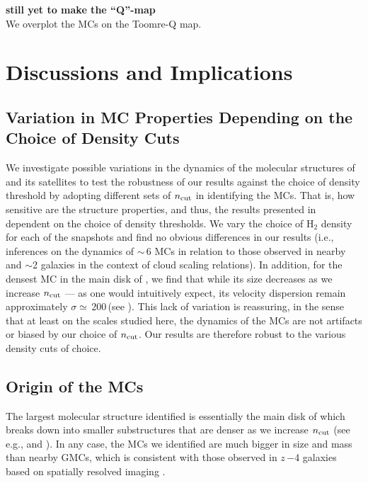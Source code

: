 \IfFileExists{emulateapjlegacy.cls}{\documentclass[iop]{emulateapjlegacy}}{\documentclass[iop]{emulateapj}}
\begin{document}
{\bf still yet to make the ``Q''-map} \\

We overplot the MCs on the Toomre-Q map.



\section{Discussions and Implications}     \label{sec:diss}

\subsection{Variation in MC Properties Depending on the Choice of Density Cuts}	 \label{sec:ncut}
We investigate possible variations in the dynamics of the molecular structures of \flower and its satellites
to test
the robustness of our results against the choice of density threshold by adopting
different sets of $n_{\rm cut}$ in identifying the MCs.
That is, how sensitive are the structure properties, and thus, the results presented in 
dependent on the choice of density thresholds.
We vary the choice of H$_2$ density for each of the snapshots and
find no obvious differences in our results (i.e., inferences on the dynamics of \z$\sim$\,6
MCs in relation to those observed in nearby and \z$\sim$2 galaxies in the context of
cloud scaling relations).
In addition, for the densest MC in the main disk of \flower, we find that while
its size decreases as we increase $n_{\rm cut}$ --- as one would intuitively expect,
its velocity dispersion remain
approximately $\sigma\simeq$\,200\,\kms (see ).
This lack of variation is reassuring, in the sense that at least on the scales studied here,
the dynamics of the MCs are not artifacts or biased by our choice of $n_{\rm cut}$.
Our results are therefore robust to the various density cuts of choice.


\subsection{Origin of the MCs} \label{sec:origin}
The largest molecular structure identified is essentially the main disk of \flower which breaks down into smaller
substructures that are denser as we increase $n_{\rm cut}$ (see e.g.,  and ). In any case,
the MCs we identified are much bigger in size and mass than nearby GMCs, which is consistent with
those observed in $z$\,$-$4 galaxies based on spatially resolved imaging \citep{Swinbank11a}.
\end{document}
